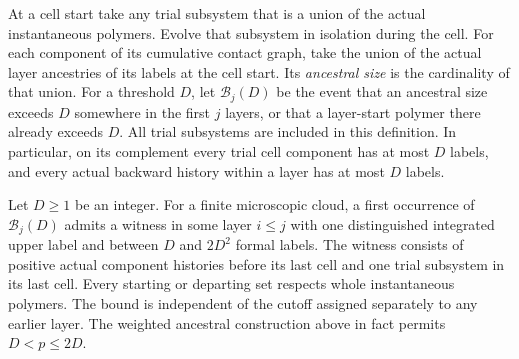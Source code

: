 At a cell start take any trial subsystem that is a union of the
actual instantaneous polymers. Evolve that subsystem in
isolation during the cell. For each component of its cumulative
contact graph, take the union of the actual layer ancestries of
its labels at the cell start. Its \emph{ancestral size} is the
cardinality of that union. For a threshold $D$, let
$\mathcal B_j(D)$ be the event that an ancestral size exceeds
$D$ somewhere in the first $j$ layers, or that a layer-start
polymer there already exceeds $D$. All trial subsystems are
included in this definition. In particular, on its complement
every trial cell component has at most $D$ labels, and every
actual backward history within a layer has at most $D$ labels.

\begin{lemma}
\label{close:witness-extraction}
Let $D\geq1$ be an integer. For a finite microscopic cloud, a first occurrence of
$\mathcal B_j(D)$ admits a witness in some layer $i\leq j$
with one distinguished integrated upper label and between $D$
and $2D^2$ formal labels. The witness consists of positive actual
component histories before its last cell and one trial subsystem
in its last cell. Every starting or departing set respects whole
instantaneous polymers. The bound is independent of the cutoff
assigned separately to any earlier layer. The weighted ancestral
construction above in fact permits $D<p\leq2D$.
\end{lemma}
